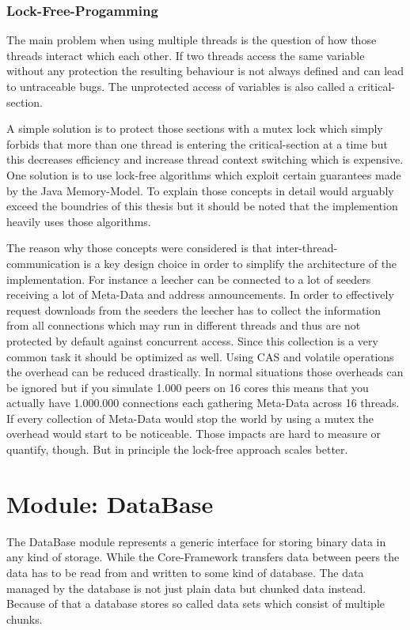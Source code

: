 \subsubsection{Lock-Free-Progamming}
\label{subsecsec:lockfree}
The main problem when using multiple threads is the question of how those threads interact which each other. If two threads access the same variable without any protection the resulting behaviour is not always defined and can lead to untraceable bugs. The unprotected access of variables is also called a critical-section.

A simple solution is to protect those sections with a mutex lock which simply forbids that more than one thread is entering the critical-section at a time but this decreases efficiency and increase thread context switching which is expensive. One solution is to use lock-free algorithms which exploit certain guarantees made by the Java Memory-Model. To explain those concepts in detail would arguably exceed the boundries of this thesis but it should be noted that the implemention heavily uses those algorithms.

The reason why those concepts were considered is that inter-thread-communication is a key design choice in order to simplify the architecture of the implementation. For instance a leecher can be connected to a lot of seeders receiving a lot of Meta-Data and address announcements. In order to effectively request downloads from the seeders the leecher has to collect the information from all connections which may run in different threads and thus are not protected by default against concurrent access. Since this collection is a very common task it should be optimized as well. Using CAS and volatile operations the overhead can be reduced drastically. In normal situations those overheads can be ignored but if you simulate 1.000 peers on 16 cores this means that you actually have 1.000.000 connections each gathering Meta-Data across 16 threads. If every collection of Meta-Data would stop the world by using a mutex the overhead would start to be noticeable. Those impacts are hard to measure or quantify, though. But in principle the lock-free approach scales better.

\cleardoublepage
\section{Module: DataBase}
\label{sec:database}
The DataBase module represents a generic interface for storing binary data in any kind of storage. While the Core-Framework transfers data between peers the data has to be read from and written to some kind of database. The data managed by the database is not just plain data but chunked data instead. Because of that a database stores so called data sets which consist of multiple chunks. 


